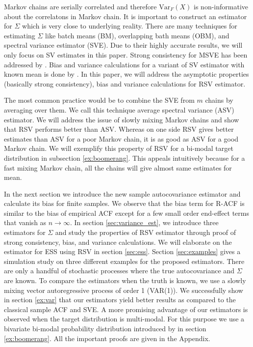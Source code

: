 \documentclass[11pt]{article}
\newcommand{\Var}{\text{Var}}
\theoremstyle{remark}
\begin{document}
Markov chains are serially correlated and therefore $\Var_F(X)$ is non-informative about the correlatons in Markov chain. It is important to construct an estimator for $\Sigma$ which is very close to underlying reality. There are many techniques for estimating $\Sigma$ like batch means (BM), overlapping bath means (OBM), and spectral variance estimator (SVE). Due to their highly accurate results, we will only focus on SV estimates in this paper. Strong consistency for MSVE has been addressed by \cite{vats:fleg:jon:2018}. Bias and variance calculations for a variant of SV estimator with known mean is done by \cite{hannan2009multiple}. In this paper, we will address the asymptotic properties (basically strong consistency), bias and variance calculations for RSV estimator. 

The most common practice would be to combine the SVE from $m$ chains by averaging over them. We call this technique average spectral variance (ASV) estimator. We will address the issue of slowly mixing Markov chains and show that RSV performs better than ASV. Whereas on one side RSV gives better estimates than ASV for a poor Markov chain, it is as good as ASV for a good Markov chain. We will exemplify this property of RSV for a bi-modal target distribution in subsection \ref{ex:boomerang}. This appeals intuitively because for a fast mixing Markov chain, all the chains will give almost same estimates for mean. 

In the next section we introduce the new sample autocovariance estimator and calculate its bias for finite samples. We observe that the bias term for R-ACF is similar to the bias of empirical ACF except for a few small order end-effect terms that vanish as $n \to \infty$. In section \ref{sec:variance_est}, we introduce three estimators for $\Sigma$ and study the properties of RSV estimator through proof of strong consistency, bias, and variance calculations. We will elaborate on the estimator for ESS using RSV in section \ref{sec:ess}. Section \ref{sec:examples} gives a simulation study on three different examples for the proposed estimators. There are only a handful of stochastic processes where the true autocovariance and $\Sigma$ are known. To compare the estimators when the truth is known, we use a slowly mixing vector autoregressive process of order 1 (VAR(1)). We successfully show in section \ref{ex:var} that our estimators yield better results as compared to the classical sample ACF and SVE. A more promising advantage of our estimators is observed when the target distribution is multi-modal. For this purpose we use a bivariate bi-modal probability distribution introduced by \cite{gelman1991note} in section \ref{ex:boomerang}. All the important proofs are given in the Appendix. 
\end{document}

